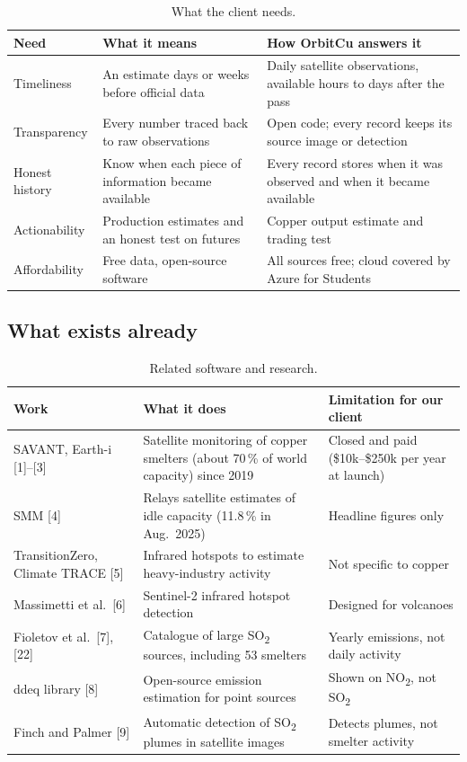 \documentclass[10pt,a4paper]{article}
\newcommand{\SOtwo}{SO\textsubscript{2}}
\begin{document}
\begin{table}[H]
\centering\small
\begin{tabularx}{\textwidth}{@{}l X X@{}}
\toprule
\textbf{Need} & \textbf{What it means} & \textbf{How OrbitCu answers it}\\
\midrule
Timeliness & An estimate days or weeks before official data & Daily satellite observations, available hours to days after the pass\\
Transparency & Every number traced back to raw observations & Open code; every record keeps its source image or detection\\
Honest history & Know when each piece of information became available & Every record stores when it was observed and when it became available\\
Actionability & Production estimates and an honest test on futures & Copper output estimate and trading test\\
Affordability & Free data, open-source software & All sources free; cloud covered by Azure for Students\\
\bottomrule
\end{tabularx}
\caption{What the client needs.}
\end{table}

\subsection{What exists already}
\begin{table}[H]
\centering\small
\begin{tabularx}{\textwidth}{@{}l X X@{}}
\toprule
\textbf{Work} & \textbf{What it does} & \textbf{Limitation for our client}\\
\midrule
SAVANT, Earth-i [1]--[3] & Satellite monitoring of copper smelters (about 70\,\% of world capacity) since 2019 & Closed and paid (\$10k--\$250k per year at launch)\\
SMM [4] & Relays satellite estimates of idle capacity (11.8\,\% in Aug.\ 2025) & Headline figures only\\
TransitionZero, Climate TRACE [5] & Infrared hotspots to estimate heavy-industry activity & Not specific to copper\\
Massimetti et al.\ [6] & Sentinel-2 infrared hotspot detection & Designed for volcanoes\\
Fioletov et al.\ [7], [22] & Catalogue of large \SOtwo{} sources, including 53 smelters & Yearly emissions, not daily activity\\
ddeq library [8] & Open-source emission estimation for point sources & Shown on NO\textsubscript{2}, not \SOtwo\\
Finch and Palmer [9] & Automatic detection of \SOtwo{} plumes in satellite images & Detects plumes, not smelter activity\\
\bottomrule
\end{tabularx}
\caption{Related software and research.}
\end{table}
\end{document}

